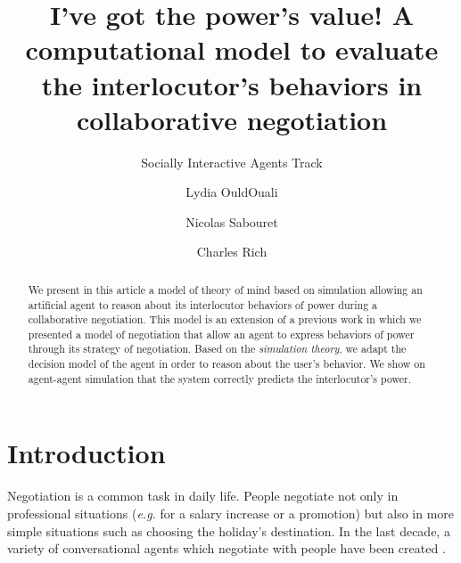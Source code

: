 \documentclass[sigconf]{aamas}  %
\begin{document}
	
	\title{I've got the power's value! A computational model to evaluate the interlocutor's behaviors in collaborative negotiation}  %

	\subtitle{Socially Interactive Agents Track}

	
	

	\author{Lydia OuldOuali}
	
	\author{Nicolas Sabouret}
	
	
	\author{Charles Rich}
	

	
	\begin{abstract}  %
		We present in this article a model of theory of mind based on simulation allowing an artificial agent to reason about its interlocutor behaviors of power during a collaborative negotiation. This model is an extension of a previous work in which we presented a model of negotiation that allow an agent to express behaviors of power through its strategy of negotiation. Based on the \emph{simulation theory}, we adapt the decision model of the agent in order to reason about the user's behavior. We show on agent-agent	simulation that the system correctly predicts the interlocutor’s
		power.
		
	\end{abstract}
	

	
	\maketitle

	
	\section{Introduction}
	
	Negotiation is a common task in daily life. People negotiate not only in professional situations (\emph{e.g.} for a salary increase or a promotion) but also in more simple situations such as choosing the holiday's destination. In the last decade, a variety of conversational agents which negotiate with people  have been created \cite{pynadath2013you,gratch2016misrepresentation,klatt2011negotiations}.
	
\end{document}
